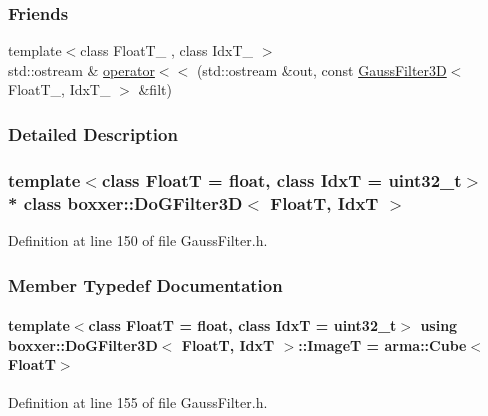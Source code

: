 \subsubsection*{Friends}
\begin{DoxyCompactItemize}
\item 
{\footnotesize template$<$class Float\+T\+\_\+ , class Idx\+T\+\_\+ $>$ }\\std\+::ostream \& \hyperlink{classboxxer_1_1DoGFilter3D_a3e7ff88dad2f821551e56939779d24ba}{operator$<$$<$} (std\+::ostream \&out, const \hyperlink{classboxxer_1_1GaussFilter3D}{Gauss\+Filter3D}$<$ Float\+T\+\_\+, Idx\+T\+\_\+ $>$ \&filt)
\end{DoxyCompactItemize}


\subsubsection{Detailed Description}
\subsubsection*{template$<$class FloatT = float, class IdxT = uint32\+\_\+t$>$\\*
class boxxer\+::\+Do\+G\+Filter3\+D$<$ Float\+T, Idx\+T $>$}



Definition at line 150 of file Gauss\+Filter.\+h.



\subsubsection{Member Typedef Documentation}
\paragraph[{\texorpdfstring{ImageT}{ImageT}}]{\setlength{\rightskip}{0pt plus 5cm}template$<$class FloatT  = float, class IdxT  = uint32\+\_\+t$>$ using {\bf boxxer\+::\+Do\+G\+Filter3D}$<$ FloatT, IdxT $>$\+::{\bf ImageT} =  arma\+::\+Cube$<$FloatT$>$}\hypertarget{classboxxer_1_1DoGFilter3D_ad90ef0ddf06b326066e2b62bab4e59b3}{}\label{classboxxer_1_1DoGFilter3D_ad90ef0ddf06b326066e2b62bab4e59b3}


Definition at line 155 of file Gauss\+Filter.\+h.

